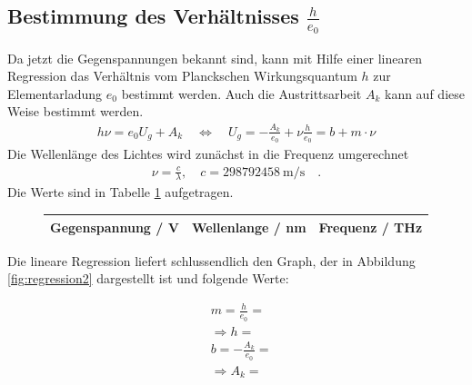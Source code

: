 \clearpage

\subsection{Bestimmung des Verhältnisses $\frac{h}{e_0}$}
Da jetzt die Gegenspannungen bekannt sind, kann mit Hilfe einer linearen Regression das Verhältnis vom Planckschen Wirkungsquantum $h$ zur Elementarladung $e_0$ bestimmt werden. Auch die Austrittsarbeit $A_k$ kann auf diese Weise bestimmt werden.
\begin{align}
	h \nu = e_0 U_g + A_k \quad \Leftrightarrow \quad U_g = -\frac{A_k}{e_0} +\nu \frac{h}{e_0} = b + m \cdot \nu
\end{align}
Die Wellenlänge des Lichtes  wird zunächst in die Frequenz umgerechnet
\begin{align}
	\nu = \frac{c}{ \lambda}, \quad c =\SI{298792458}{\meter\per\second} \quad .
\end{align}
Die Werte sind in Tabelle \ref{tab:h_durch_e} aufgetragen.
\begin{figure}[h!]
	\centering
	\begin{tabular}{c|c|c}
		Gegenspannung / V & Wellenlange / \si{\nano\meter}  & Frequenz / \si{\tera\hertz}\\
		\hline
		
	\end{tabular}
	\label{tab:h_durch_e}
\end{figure}

Die lineare Regression liefert schlussendlich den Graph, der in Abbildung \ref{fig:regression2} dargestellt ist und folgende Werte:



\begin{align}
	& m = \frac{h}{e_0} =  \\
	& \Rightarrow h =   \\
	& b = - \frac{A_k}{e_0} =  \\
	& \Rightarrow A_k =  
	\end{align}
	
	
\clearpage
